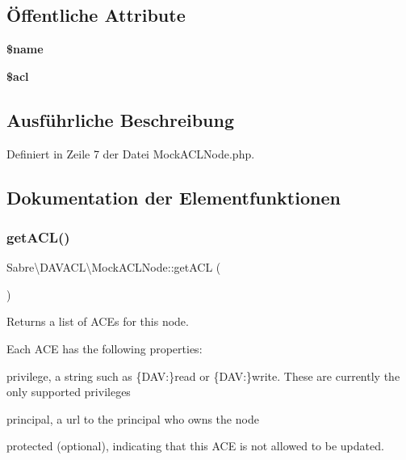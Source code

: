\subsection*{Öffentliche Attribute}
\begin{DoxyCompactItemize}
\item 
\mbox{\label{class_sabre_1_1_d_a_v_a_c_l_1_1_mock_a_c_l_node_a840ca8d28abaddf55531b29350742e20}} 
{\bfseries \$name}
\item 
\mbox{\label{class_sabre_1_1_d_a_v_a_c_l_1_1_mock_a_c_l_node_ace9c0a05b51d6c82688ad80302121ed7}} 
{\bfseries \$acl}
\end{DoxyCompactItemize}


\subsection{Ausführliche Beschreibung}


Definiert in Zeile 7 der Datei Mock\+A\+C\+L\+Node.\+php.



\subsection{Dokumentation der Elementfunktionen}
\mbox{\label{class_sabre_1_1_d_a_v_a_c_l_1_1_mock_a_c_l_node_a2c9847639e9c69f53d39a8d71d704ab6}} 
\subsubsection{\texorpdfstring{get\+A\+C\+L()}{getACL()}}
{\footnotesize\ttfamily Sabre\textbackslash{}\+D\+A\+V\+A\+C\+L\textbackslash{}\+Mock\+A\+C\+L\+Node\+::get\+A\+CL (\begin{DoxyParamCaption}{ }\end{DoxyParamCaption})}

Returns a list of A\+CE\textquotesingle{}s for this node.

Each A\+CE has the following properties\+:
\begin{DoxyItemize}
\item \textquotesingle{}privilege\textquotesingle{}, a string such as \{D\+AV\+:\}read or \{D\+AV\+:\}write. These are currently the only supported privileges
\item \textquotesingle{}principal\textquotesingle{}, a url to the principal who owns the node
\item \textquotesingle{}protected\textquotesingle{} (optional), indicating that this A\+CE is not allowed to be updated.
\end{DoxyItemize}

